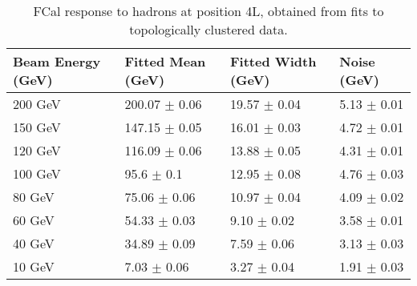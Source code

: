 \begin{table}
\begin{center}
\begin{tabular}[!htb]{|l|l|l|l|}
\hline
Beam Energy (GeV) & Fitted Mean (GeV)& Fitted Width (GeV)& Noise (GeV) \\
\hline
200 GeV  &  200.07 $\pm$    0.06 &   19.57 $\pm$    0.04 &    5.13 $\pm$    0.01 \\
150 GeV  &  147.15 $\pm$    0.05 &   16.01 $\pm$    0.03 &    4.72 $\pm$    0.01 \\
120 GeV  &  116.09 $\pm$    0.06 &   13.88 $\pm$    0.05 &    4.31 $\pm$    0.01 \\
100 GeV  &   95.6 $\pm$    0.1 &   12.95 $\pm$    0.08 &    4.76 $\pm$    0.03 \\
 80 GeV  &   75.06 $\pm$    0.06 &   10.97 $\pm$    0.04 &    4.09 $\pm$    0.02 \\
 60 GeV  &   54.33 $\pm$    0.03 &    9.10 $\pm$    0.02 &    3.58 $\pm$    0.01 \\
 40 GeV  &   34.89 $\pm$    0.09 &    7.59 $\pm$    0.06 &    3.13 $\pm$    0.03 \\
 10 GeV  &    7.03 $\pm$    0.06 &    3.27 $\pm$    0.04 &    1.91 $\pm$    0.03 \\
\hline
\end{tabular}
\caption{FCal response to hadrons at position 4L, obtained from fits to topologically clustered data.}
\label{table_hadron_response_t420_4L}
\end{center}
\end{table}


